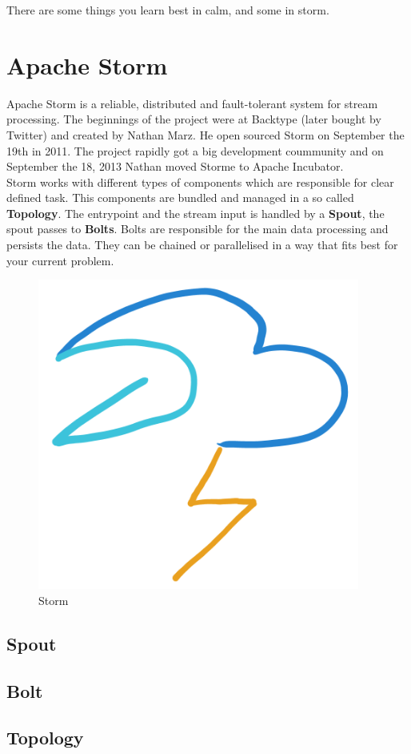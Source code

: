 \begin{savequote}[75mm]
There are some things you learn best in calm, and some in storm.
\end{savequote}

\chapter{Apache Storm}

Apache Storm is a reliable, distributed and fault-tolerant system for stream processing.
The beginnings of the project were at Backtype (later bought by Twitter) and created by Nathan Marz.
He open sourced Storm on September the 19th in 2011. The project rapidly got a big development coummunity and
on September the 18, 2013 Nathan moved Storme to Apache Incubator.\\

Storm works with different types of components which are responsible for clear defined task.
This components are bundled and managed in a so called \textbf{Topology}.
The entrypoint and the stream input is handled by a \textbf{Spout}, the spout passes to \textbf{Bolts}.
Bolts are responsible for the main data processing and persists the data.
They can be chained or parallelised in a way that fits best for your current problem.
\newpage

\begin{figure}[H]
\centering
\includegraphics[width=300pt]{images/storm.png}
\caption[Storm]{Storm}
\end{figure}
\section{Spout}


\newpage

\section{Bolt}

\newpage

\section{Topology}